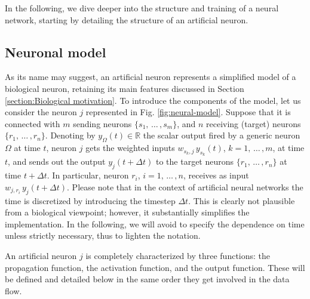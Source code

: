\documentclass[12pt, a4paper, twoside, openright, notitlepage]{report}
\numberwithin{equation}{chapter}
\theoremstyle{theorem}
\theoremstyle{definition}
\theoremstyle{remark}
\theoremstyle{proposition}
\numberwithin{figure}{chapter}
\begin{document}
		\noindent In the following, we dive deeper into the structure and training of a neural network, starting by detailing the structure of an artificial neuron.  
		
	\vspace*{0.3cm}
														
	\subsection{Neuronal model}
	\label{section:Neuronal model}
	
		As its name may suggest, an artificial neuron represents a simplified model of a biological neuron, retaining its main features discussed in Section \ref{section:Biological motivation}. To introduce the components of the model, let us consider the neuron $j$ represented in Fig. \ref{fig:neural-model}. Suppose that it is connected with $m$ sending neurons $\big\lbrace s_1, \, \ldots \, , s_m \big\rbrace$, and $n$ receiving (target) neurons $\big\lbrace r_1, \, \ldots \, , r_n \big\rbrace$. Denoting by $y_{\Omega}(t) \in \mathbb{R}$ the scalar output fired by a generic neuron $\Omega$ at time $t$, neuron $j$ gets the weighted inputs $w_{s_k,j} \, y_{s_k}(t)$, $k = 1, \, \ldots \, , m$, at time $t$, and sends out the output $y_j(t + \Delta t)$ to the target neurons $\big\lbrace r_1, \, \ldots \, , r_n \big\rbrace$ at time $t + \Delta t$. In particular, neuron $r_i$, $i = 1, \, \ldots \, , n$, receives as input $w_{j,r_i} \, y_j(t + \Delta t)$. Please note that in the context of artificial neural networks the time is discretized by introducing the timestep $\Delta t$. This is clearly not plausible from a biological viewpoint; however, it substantially simplifies the implementation. In the following, we will avoid to specify the dependence on time unless strictly necessary, thus to lighten the notation.
		
		An artificial neuron $j$ is completely characterized by three functions: the propagation function, the activation function, and the output function. These will be defined and detailed below in the same order they get involved in the data flow. 
		
		\vspace*{0.3cm}
		
\end{document}
